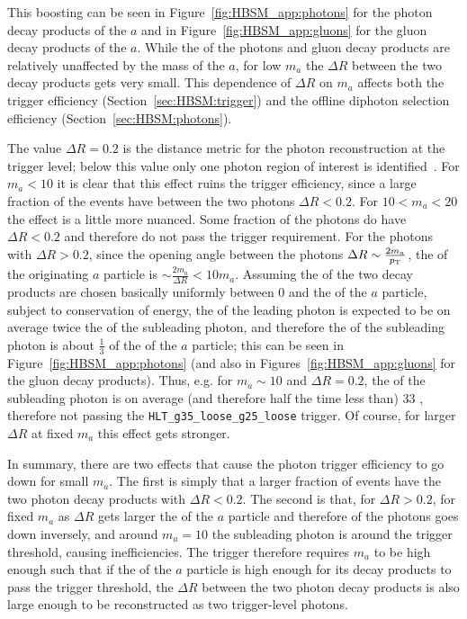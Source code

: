 This boosting can be seen in Figure~\ref{fig:HBSM_app:photons} for the photon decay products of the $a$ and in Figure~\ref{fig:HBSM_app:gluons} for the gluon decay products of the $a$.
While the \pt{} of the photons and gluon decay products are relatively unaffected by the mass of the $a$, for low $m_a$ the $\Delta R$ between the two decay products gets very small.
This dependence of $\Delta R$ on $m_a$ affects both the trigger efficiency (Section~\ref{sec:HBSM:trigger}) and the offline diphoton selection efficiency (Section~\ref{sec:HBSM:photons}).

The value $\Delta R=0.2$ is the distance metric for the photon reconstruction at the trigger level; below this value only one photon region of interest is identified~\cite{Achenbach:2008zzb,Aad:2019wsl}.
For $m_a<10$ \GeV{} it is clear that this effect ruins the trigger efficiency, since a large fraction of the events have between the two photons $\Delta R<0.2$.
For $10<m_a<20$ \GeV{} the effect is a little more nuanced.
Some fraction of the photons do have $\Delta R < 0.2$ and therefore do not pass the trigger requirement.
For the photons with $\Delta R > 0.2$, since the opening angle between the photons $\Delta R \sim \frac{2m_a}{p_{\text{T}}}$, the \pt{} of the originating $a$ particle is $\sim \frac{2m_a}{\Delta R} < 10 m_a$.
Assuming the \pt{} of the two decay products are chosen basically uniformly between $0$ and the \pt{} of the $a$ particle, subject to conservation of energy, the \pt{} of the leading photon is expected to be on average twice the \pt{} of the subleading photon, and therefore the \pt{} of the subleading photon is about $\frac{1}{3}$ of the \pt{} of the $a$ particle; this can be seen in Figure~\ref{fig:HBSM_app:photons} (and also in Figures~\ref{fig:HBSM_app:gluons} for the gluon decay products).
Thus, e.g. for $m_a \sim 10$ \GeV{} and $\Delta R = 0.2$, the \pt{} of the subleading photon is on average (and therefore half the time less than) $33$ \GeV{}, therefore not passing the \texttt{HLT\_g35\_loose\_g25\_loose} trigger.
Of course, for larger $\Delta R$ at fixed $m_a$ this effect gets stronger.

In summary, there are two effects that cause the photon trigger efficiency to go down for small $m_a$.
The first is simply that a larger fraction of events have the two photon decay products with $\Delta R<0.2$.
The second is that, for $\Delta R>0.2$, for fixed $m_a$ as $\Delta R$ gets larger the \pt{} of the $a$ particle and therefore of the photons goes down inversely, and around $m_a=10$ \GeV{} the subleading photon is around the trigger threshold, causing inefficiencies.
The trigger therefore requires $m_a$ to be high enough such that if the \pt{} of the $a$ particle is high enough for its decay products to pass the trigger threshold, the $\Delta R$ between the two photon decay products is also large enough to be reconstructed as two trigger-level photons.

